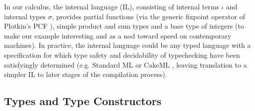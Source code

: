 \documentclass[9pt,preprint]{sigplanconf}
\begin{document}
In our calculus, the internal language (IL), consisting of internal terms $\iota$ and internal types $\sigma$, provides partial functions (via the generic fixpoint operator of Plotkin's PCF \cite{PCF}), simple product and sum types and a base type of integers (to make our example interesting and as a nod toward speed on contemporary machines). In practice, the internal language could be any typed  language with a specification for which type safety and decidability of typechecking have been satisfyingly determined (e.g. Standard ML or CakeML \cite{cakeml}, leaving translation to a simpler IL to later stages of the compilation process).

\subsection{Types and Type Constructors}
\end{document}
